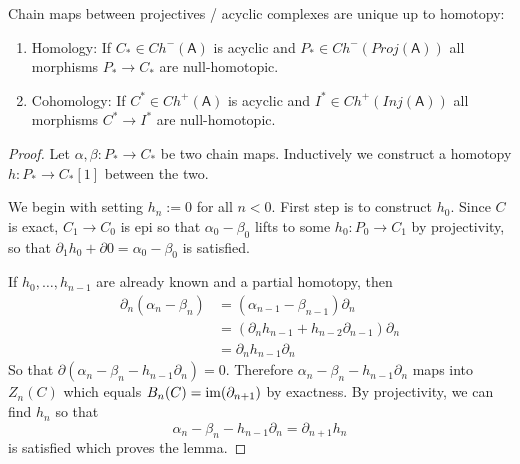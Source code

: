 \documentclass[fontsize=11pt,fleqn,a4paper]{scrartcl}
\begin{document}
\begin{lemma}
Chain maps between projectives / acyclic complexes are unique up to homotopy:
\begin{multicols}{2}
\begin{enumerate}
\item Homology: If $C_\ast\in Ch^-(\mathsf{A})$ is acyclic and $P_\ast\in Ch^-(Proj(\mathsf{A}))$ all morphisms $P_\ast\to C_\ast$ are null-homotopic.
\item Cohomology: If $C^\ast\in Ch^+(\mathsf{A})$ is acyclic and $I^\ast\in Ch^+(Inj(\mathsf{A}))$ all morphisms $C^\ast \to I^\ast$ are null-homotopic.
\end{enumerate}
\end{multicols}
\end{lemma}
\begin{proof}
Let $\alpha,\beta: P_\ast\to C_\ast$ be two chain maps. Inductively we construct a homotopy $h:P_\ast\to C_\ast[1]$ between the two.


We begin with setting $h_n:=0$ for all $n<0$. First step is to construct $h_0$. Since $C$ is exact, $C_1\to C_0$ is epi so that $\alpha_0-\beta_0$ lifts to some $h_0: P_0 \to C_1$ by projectivity, so that $\partial_1 h_0 + \partial 0 = \alpha_0-\beta_0$ is satisfied.

If $h_0,\ldots,h_{n-1}$ are already known and a partial homotopy, then
\begin{align*}
\partial_n(\alpha_n-\beta_n) &= (\alpha_{n-1}-\beta_{n-1})\partial_n \\
&=(\partial_n h_{n-1} + h_{n-2} \partial_{n-1})\partial_n \\
&=\partial_n h_{n-1} \partial_n
\end{align*}
So that $\partial(\alpha_n-\beta_n - h_{n-1}\partial_n)=0$. Therefore $\alpha_n-\beta_n-h_{n-1}\partial_n$ maps into $Z_n(C)$ which equals $B_n(C)=\operatorname{im}(\partial_{n+1})$ by exactness. By projectivity, we can find $h_n$ so that
\[\alpha_n-\beta_n - h_{n-1}\partial_n = \partial_{n+1} h_n\]
is satisfied which proves the lemma.
\end{proof}
\end{document}
